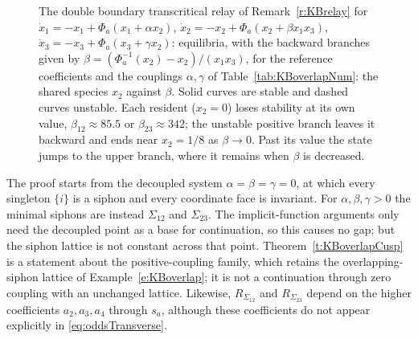 \begin{figure}[H]
\begin{minipage}{.48\linewidth}
\end{minipage}
\caption{The double boundary transcritical relay of Remark~\ref{r:KBrelay} for $\dot x_1=-x_1+\Phi_a(x_1+\alpha x_2)$, $\dot x_2=-x_2+\Phi_a(x_2+\beta x_1x_3)$, $\dot x_3=-x_3+\Phi_a(x_3+\gamma x_2)$: equilibria, with the backward branches given by $\beta=(\Phi_a^{-1}(x_2)-x_2)/(x_1x_3)$, for the reference coefficients and the couplings
$\alpha,\gamma$ of Table~\ref{tab:KBoverlapNum}: the shared species $x_2$ against $\beta$. Solid curves are stable and dashed curves
unstable. Each resident ($x_2=0$) loses stability at its own value, $\beta_{12}\approx85.5$ or $\beta_{23}\approx342$; the unstable
positive branch leaves it backward and ends near $x_2=1/8$ as $\beta\to0$. Past its value the state jumps to the upper
branch, where it remains when $\beta$ is decreased.}
\label{fig:relay}
\end{figure}

The proof starts from the decoupled system $\alpha=\beta=\gamma=0$, at which
every singleton $\{i\}$ is a siphon and every coordinate face is invariant. For
$\alpha,\beta,\gamma>0$ the minimal siphons are instead $\Sigma_{12}$ and
$\Sigma_{23}$. The implicit-function arguments only need the decoupled point as
a base for continuation, so this causes no gap; but the siphon lattice is not
constant across that point. Theorem~\ref{t:KBoverlapCusp} is a statement about
the positive-coupling family, which retains the overlapping-siphon lattice of
Example~\ref{e:KBoverlap}; it is not a continuation through zero coupling with an
unchanged lattice. Likewise, $R_{\Sigma_{12}}$ and $R_{\Sigma_{23}}$ depend on the
higher coefficients $a_2,a_3,a_4$ through $s_a$, although these coefficients do
not appear explicitly in \eqref{eq:oddsTransverse}.
\eeR

